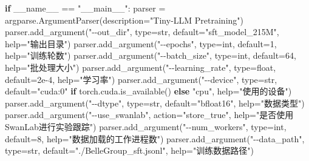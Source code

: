 \documentclass[
]{article}
\newenvironment{Shaded}{}{}
\newcommand{\BuiltInTok}[1]{\textcolor[rgb]{0.00,0.50,0.00}{#1}}
\newcommand{\ControlFlowTok}[1]{\textcolor[rgb]{0.00,0.44,0.13}{\textbf{#1}}}
\newcommand{\DecValTok}[1]{\textcolor[rgb]{0.25,0.63,0.44}{#1}}
\newcommand{\FloatTok}[1]{\textcolor[rgb]{0.25,0.63,0.44}{#1}}
\newcommand{\NormalTok}[1]{#1}
\newcommand{\OperatorTok}[1]{\textcolor[rgb]{0.40,0.40,0.40}{#1}}
\newcommand{\StringTok}[1]{\textcolor[rgb]{0.25,0.44,0.63}{#1}}
\newcommand{\VariableTok}[1]{\textcolor[rgb]{0.10,0.09,0.49}{#1}}
\begin{document}
\begin{Shaded}
\begin{Highlighting}[]
\ControlFlowTok{if} \VariableTok{\_\_name\_\_} \OperatorTok{==} \StringTok{"\_\_main\_\_"}\NormalTok{:}
\NormalTok{    parser }\OperatorTok{=}\NormalTok{ argparse.ArgumentParser(description}\OperatorTok{=}\StringTok{"Tiny{-}LLM Pretraining"}\NormalTok{)}
\NormalTok{    parser.add\_argument(}\StringTok{"{-}{-}out\_dir"}\NormalTok{, }\BuiltInTok{type}\OperatorTok{=}\BuiltInTok{str}\NormalTok{, default}\OperatorTok{=}\StringTok{"sft\_model\_215M"}\NormalTok{, }\BuiltInTok{help}\OperatorTok{=}\StringTok{"输出目录"}\NormalTok{)}
\NormalTok{    parser.add\_argument(}\StringTok{"{-}{-}epochs"}\NormalTok{, }\BuiltInTok{type}\OperatorTok{=}\BuiltInTok{int}\NormalTok{, default}\OperatorTok{=}\DecValTok{1}\NormalTok{, }\BuiltInTok{help}\OperatorTok{=}\StringTok{"训练轮数"}\NormalTok{)}
\NormalTok{    parser.add\_argument(}\StringTok{"{-}{-}batch\_size"}\NormalTok{, }\BuiltInTok{type}\OperatorTok{=}\BuiltInTok{int}\NormalTok{, default}\OperatorTok{=}\DecValTok{64}\NormalTok{, }\BuiltInTok{help}\OperatorTok{=}\StringTok{"批处理大小"}\NormalTok{)}
\NormalTok{    parser.add\_argument(}\StringTok{"{-}{-}learning\_rate"}\NormalTok{, }\BuiltInTok{type}\OperatorTok{=}\BuiltInTok{float}\NormalTok{, default}\OperatorTok{=}\FloatTok{2e{-}4}\NormalTok{, }\BuiltInTok{help}\OperatorTok{=}\StringTok{"学习率"}\NormalTok{)}
\NormalTok{    parser.add\_argument(}\StringTok{"{-}{-}device"}\NormalTok{, }\BuiltInTok{type}\OperatorTok{=}\BuiltInTok{str}\NormalTok{, default}\OperatorTok{=}\StringTok{"cuda:0"} \ControlFlowTok{if}\NormalTok{ torch.cuda.is\_available() }\ControlFlowTok{else} \StringTok{"cpu"}\NormalTok{, }\BuiltInTok{help}\OperatorTok{=}\StringTok{"使用的设备"}\NormalTok{)}
\NormalTok{    parser.add\_argument(}\StringTok{"{-}{-}dtype"}\NormalTok{, }\BuiltInTok{type}\OperatorTok{=}\BuiltInTok{str}\NormalTok{, default}\OperatorTok{=}\StringTok{"bfloat16"}\NormalTok{, }\BuiltInTok{help}\OperatorTok{=}\StringTok{"数据类型"}\NormalTok{)}
\NormalTok{    parser.add\_argument(}\StringTok{"{-}{-}use\_swanlab"}\NormalTok{, action}\OperatorTok{=}\StringTok{"store\_true"}\NormalTok{, }\BuiltInTok{help}\OperatorTok{=}\StringTok{"是否使用SwanLab进行实验跟踪"}\NormalTok{)}
\NormalTok{    parser.add\_argument(}\StringTok{"{-}{-}num\_workers"}\NormalTok{, }\BuiltInTok{type}\OperatorTok{=}\BuiltInTok{int}\NormalTok{, default}\OperatorTok{=}\DecValTok{8}\NormalTok{, }\BuiltInTok{help}\OperatorTok{=}\StringTok{"数据加载的工作进程数"}\NormalTok{)}
\NormalTok{    parser.add\_argument(}\StringTok{"{-}{-}data\_path"}\NormalTok{, }\BuiltInTok{type}\OperatorTok{=}\BuiltInTok{str}\NormalTok{, default}\OperatorTok{=}\StringTok{"./BelleGroup\_sft.jsonl"}\NormalTok{, }\BuiltInTok{help}\OperatorTok{=}\StringTok{"训练数据路径"}\NormalTok{)}

\end{Highlighting}
\end{Shaded}
\end{document}
